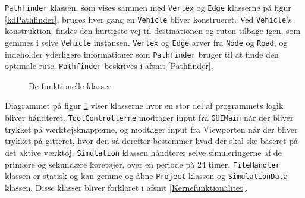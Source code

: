 \texttt{Pathfinder} klassen, som vises sammen med \texttt{Vertex} og \texttt{Edge} klasserne på figur \ref{kdPathfinder}, bruges hver gang en \texttt{Vehicle} bliver konstrueret. Ved \texttt{Vehicle}'s konstruktion, findes den hurtigste vej til destinationen og ruten tilbage igen, som gemmes i selve \texttt{Vehicle} instansen. \texttt{Vertex} og \texttt{Edge} arver fra \texttt{Node} og \texttt{Road}, og indeholder yderligere informationer som \texttt{Pathfinder} bruger til at finde den optimale rute. \texttt{Pathfinder} beskrives i afsnit \ref{Pathfinder}.

\begin{figure}[H]
    \centering
    \caption{De funktionelle klasser}
    \label{kdFunktionelle}
\end{figure}

Diagrammet på figur \ref{kdFunktionelle} viser klasserne hvor en stor del af programmets logik bliver håndteret. \texttt{ToolControllerne} modtager input fra \texttt{GUIMain} når der bliver trykket på værktøjsknapperne, og modtager input fra Viewporten når der bliver trykket på gitteret, hvor den så derefter bestemmer hvad der skal ske baseret på det aktive værktøj. \texttt{Simulation} klassen håndterer selve simuleringerne af de primære og sekundære køretøjer, over en periode på 24 timer. \texttt{FileHandler} klassen er statisk og kan gemme og åbne \texttt{Project} klassen og \texttt{SimulationData} klassen. Disse klasser bliver forklaret i afsnit \ref{Kernefunktionalitet}.